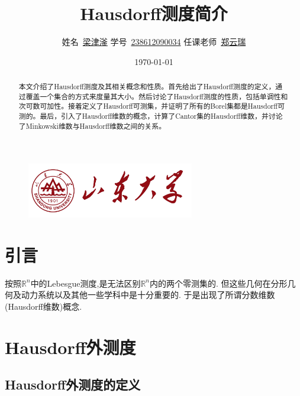 \documentclass[hyperref,a4paper,UTF8]{ctexart}
\title{\textbf{{Hausdorff测度简介}}}
\author{
\kaishu\normalsize
姓名\ \underline{梁津滏} \qquad
学号\ \underline{238612090034} \qquad
任课老师\ \underline{郑云瑞}
}
\date{\today} %
\begin{document}
\begin{figure}
    \centering
    \includegraphics[width=0.65\textwidth]{figure/SDU.jpg}
\end{figure}

\maketitle

\begin{abstract}

  本文介绍了Hausdorff测度及其相关概念和性质。首先给出了Hausdorff测度的定义，通过覆盖一个集合的方式来度量其大小。然后讨论了Hausdorff测度的性质，包括单调性和次可数可加性。接着定义了Hausdorff可测集，并证明了所有的Borel集都是Hausdorff可测的。最后，引入了Hausdorff维数的概念，计算了Cantor集的Hausdorff维数，并讨论了Minkowski维数与Hausdorff维数之间的关系。
\end{abstract}

\thispagestyle{empty} %
\newpage

\tableofcontents

\thispagestyle{empty} %
\newpage




\section{引言}

按照$\mathbb{R}^n$中的Lebesgue测度,是无法区别$\mathbb{R}^n$内的两个零测集的.
但这些几何在分形几何及动力系统以及其他一些学科中是十分重要的.
于是出现了所谓分数维数(Hausdorff维数)概念. 

\section{Hausdorff外测度}

\subsection{Hausdorff外测度的定义{\cite{Stein:1385521}\cite{1961实变函数论}}}
\end{document}
